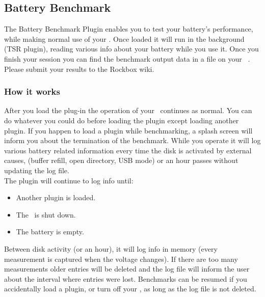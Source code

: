 \subsection{Battery Benchmark}
The Battery Benchmark Plugin enables you to test your battery's performance,
while making normal use of your \dap. Once loaded it will run in the
background (TSR plugin), reading various info about your battery while you use
it. Once you finish your session you can find the benchmark output data in a
file on your \dap\ .
Please submit your results to the Rockbox wiki.

\subsubsection{How it works}
After you load the plug-in the operation of your \dap\ continues as normal.
You can do whatever you could do before loading the plugin except loading
another plugin. If you happen to load a plugin while benchmarking, a splash
screen will inform you about the termination of the benchmark.
While you operate it will log various battery related information every time
the disk is activated by external causes, (buffer refill, open directory,
USB mode) or an hour passes without updating the log file.\\
The plugin will continue to log info until:

\begin{itemize}
\item Another plugin is loaded.
\item The \dap\ is shut down.
\item The battery is empty.
\end{itemize}
Between disk activity (or an hour), it will log info in memory (every
measurement is captured when the voltage changes). If there are too many
measurements older entries will be deleted and the log file will inform the
user about the interval where entries were lost. Benchmarks can be resumed if
you accidentally load a plugin, or turn off your \dap, as long as the log
file  is not deleted. 

